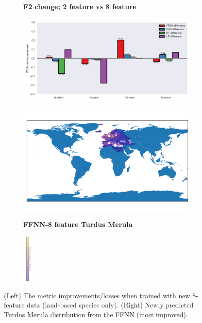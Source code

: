 \begin{figure}[hbt!]
\centering

\begin{subfigure}{.45\linewidth}
\vspace*{-1ex}  
\begin{center}
\textbf{F2 change; 2 feature vs 8 feature}
\end{center}
\vspace*{-1ex}
  \includegraphics[width=\linewidth]{Images/F2 improvement.png}
\end{subfigure} \hspace{1em}  %
\begin{subfigure}{.3\linewidth}
  \includegraphics[width=\linewidth]{Images/8 feature turdus.png}
\vspace*{-5ex}  
\begin{center}
\textbf{FFNN-8 feature Turdus Merula}
\end{center}
\vspace{0ex}
\end{subfigure}
\begin{subfigure}{.04\linewidth}
  \includegraphics[width=\linewidth, height = 2.5cm]{Images/Screenshot 2023-11-19 at 12.10.01.png}
  \vspace{1ex}
\end{subfigure}

\caption{(Left) The metric improvements/losses when trained with new 8-feature data (land-based species only). (Right) Newly predicted Turdus Merula distribution from the FFNN (most improved).}
\label{fig:8_feature}
\end{figure}
